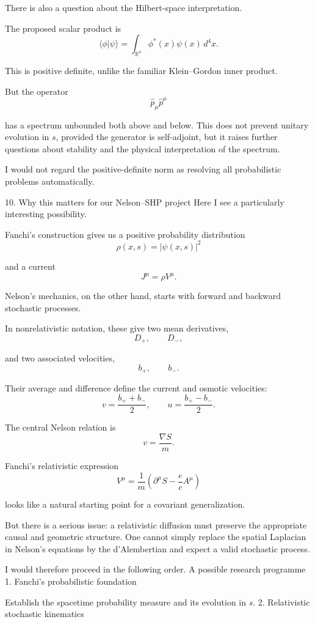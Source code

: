 There is also a question about the Hilbert-space interpretation.

The proposed scalar product is
\[
\langle\phi|\psi\rangle
=
\int_{\mathbb R^4}
\phi^*(x)\psi(x)\,d^4x.
\tag{29}
\]

This is positive definite, unlike the familiar Klein–Gordon inner product.

But the operator
\[
\hat p_\mu\hat p^\mu
\]

has a spectrum unbounded both above and below. This does not prevent unitary evolution in \(s\), provided the generator is self-adjoint, but it raises further questions about stability and the physical interpretation of the spectrum.

I would not regard the positive-definite norm as resolving all probabilistic problems automatically.

10. Why this matters for our Nelson–SHP project
Here I see a particularly interesting possibility.

Fanchi's construction gives us a positive probability distribution
\[
\rho(x,s)=|\psi(x,s)|^2
\]

and a current
\[
J^\mu=\rho V^\mu.
\]

Nelson's mechanics, on the other hand, starts with forward and backward stochastic processes.

In nonrelativistic notation, these give two mean derivatives,
\[
D_+,\qquad D_-,
\]

and two associated velocities,
\[
b_+,\qquad b_-.
\]

Their average and difference define the current and osmotic velocities:
\[
v=\frac{b_++b_-}{2},
\qquad
u=\frac{b_+-b_-}{2}.
\]

The central Nelson relation is
\[
v=\frac{\nabla S}{m}.
\]

Fanchi's relativistic expression
\[
V^\mu=
\frac{1}{m}
\left(
\partial^\mu S-\frac ec A^\mu
\right)
\]

looks like a natural starting point for a covariant generalization.

But there is a serious issue: a relativistic diffusion must preserve the appropriate causal and geometric structure. One cannot simply replace the spatial Laplacian in Nelson's equations by the d'Alembertian and expect a valid stochastic process.

I would therefore proceed in the following order.
A possible research programme
1. Fanchi's probabilistic foundation
   
   Establish the spacetime probability measure and its evolution in \(s\).
2. Relativistic stochastic kinematics
   
